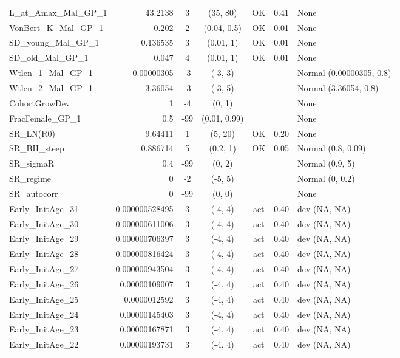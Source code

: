 \documentclass[12pt,]{article}
\begin{document}
\begin{landscape}
\begin{longtable}{lrcccll}
  L\_at\_Amax\_Mal\_GP\_1 & 43.2138 & 3 & (35, 80) & OK & 0.41 & None \\ 
  VonBert\_K\_Mal\_GP\_1 & 0.202 & 2 & (0.04, 0.5) & OK & 0.01 & None \\ 
  SD\_young\_Mal\_GP\_1 & 0.136535 & 3 & (0.01, 1) & OK & 0.01 & None \\ 
  SD\_old\_Mal\_GP\_1 & 0.047 & 4 & (0.01, 1) & OK & 0.01 & None \\ 
  Wtlen\_1\_Mal\_GP\_1 & 0.00000305 & -3 & (-3, 3) &  &  & Normal (0.00000305, 0.8) \\ 
  Wtlen\_2\_Mal\_GP\_1 & 3.36054 & -3 & (-3, 5) &  &  & Normal (3.36054, 0.8) \\ 
  CohortGrowDev & 1 & -4 & (0, 1) &  &  & None \\ 
  FracFemale\_GP\_1 & 0.5 & -99 & (0.01, 0.99) &  &  & None \\ 
  SR\_LN(R0) & 9.64411 & 1 & (5, 20) & OK & 0.20 & None \\ 
  SR\_BH\_steep & 0.886714 & 5 & (0.2, 1) & OK & 0.05 & Normal (0.8, 0.09) \\ 
  SR\_sigmaR & 0.4 & -99 & (0, 2) &  &  & Normal (0.9, 5) \\ 
  SR\_regime & 0 & -2 & (-5, 5) &  &  & Normal (0, 0.2) \\ 
  SR\_autocorr & 0 & -99 & (0, 0) &  &  & None \\ 
  Early\_InitAge\_31 & 0.000000528495 & 3 & (-4, 4) & act & 0.40 & dev (NA, NA) \\ 
  Early\_InitAge\_30 & 0.000000611006 & 3 & (-4, 4) & act & 0.40 & dev (NA, NA) \\ 
  Early\_InitAge\_29 & 0.000000706397 & 3 & (-4, 4) & act & 0.40 & dev (NA, NA) \\ 
  Early\_InitAge\_28 & 0.000000816424 & 3 & (-4, 4) & act & 0.40 & dev (NA, NA) \\ 
  Early\_InitAge\_27 & 0.000000943504 & 3 & (-4, 4) & act & 0.40 & dev (NA, NA) \\ 
  Early\_InitAge\_26 & 0.00000109007 & 3 & (-4, 4) & act & 0.40 & dev (NA, NA) \\ 
  Early\_InitAge\_25 & 0.0000012592 & 3 & (-4, 4) & act & 0.40 & dev (NA, NA) \\ 
  Early\_InitAge\_24 & 0.00000145403 & 3 & (-4, 4) & act & 0.40 & dev (NA, NA) \\ 
  Early\_InitAge\_23 & 0.00000167871 & 3 & (-4, 4) & act & 0.40 & dev (NA, NA) \\ 
  Early\_InitAge\_22 & 0.00000193731 & 3 & (-4, 4) & act & 0.40 & dev (NA, NA) \\ 

\end{longtable}
\end{landscape}
\end{document}
